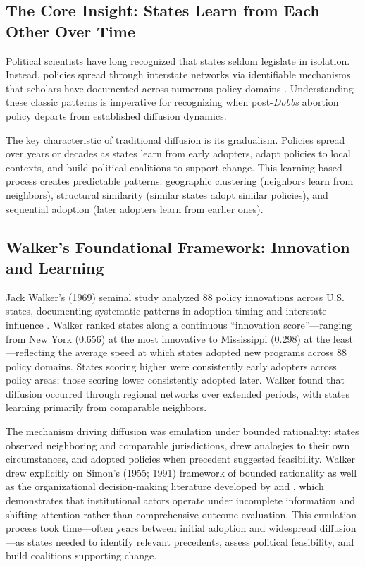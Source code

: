 \subsection{The Core Insight: States Learn from Each Other Over Time}

Political scientists have long recognized that states seldom legislate in isolation. Instead, policies spread through interstate networks via identifiable mechanisms that scholars have documented across numerous policy domains \parencite{grayInnovationStatesDiffusion1973}. Understanding these classic patterns is imperative for recognizing when post-\emph{Dobbs} abortion policy departs from established diffusion dynamics.

The key characteristic of traditional diffusion is its gradualism. Policies spread over years or decades as states learn from early adopters, adapt policies to local contexts, and build political coalitions to support change. This learning-based process creates predictable patterns: geographic clustering (neighbors learn from neighbors), structural similarity (similar states adopt similar policies), and sequential adoption (later adopters learn from earlier ones).

\subsection{Walker's Foundational Framework: Innovation and Learning}

Jack Walker's (1969) seminal study analyzed 88 policy innovations across U.S. states, documenting systematic patterns in adoption timing and interstate influence \parencite{walkerDiffusionInnovationsAmerican1969}. Walker ranked states along a continuous ``innovation score''---ranging from New York (0.656) at the most innovative to Mississippi (0.298) at the least---reflecting the average speed at which states adopted new programs across 88 policy domains. States scoring higher were consistently early adopters across policy areas; those scoring lower consistently adopted later. Walker found that diffusion occurred through regional networks over extended periods, with states learning primarily from comparable neighbors.

The mechanism driving diffusion was emulation under bounded rationality: states observed neighboring and comparable jurisdictions, drew analogies to their own circumstances, and adopted policies when precedent suggested feasibility. Walker drew explicitly on Simon's (1955; 1991) framework of bounded rationality as well as the organizational decision-making literature developed by 
\textcite{marchOrganizations1958} and \textcite{cohenGarbageCan1972}, which demonstrates that institutional actors operate under incomplete information and shifting attention rather than comprehensive outcome evaluation.
This emulation process took time---often years between initial adoption and widespread diffusion---as states needed to identify relevant precedents, assess political feasibility, and build coalitions supporting change.

